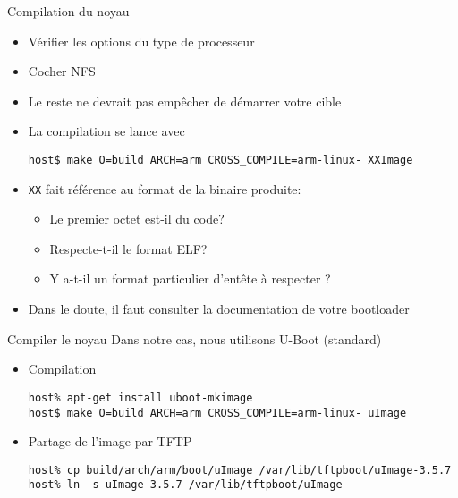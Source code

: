 \begin{frame}[fragile=singleslide]{Compilation du noyau}
  \begin{itemize}
  \item Vérifier les options du type de processeur
  \item Cocher NFS
  \item Le reste ne devrait pas empêcher de démarrer votre cible
  \item La compilation se lance avec
    \begin{lstlisting}
host$ make O=build ARCH=arm CROSS_COMPILE=arm-linux- XXImage
    \end{lstlisting}
  \item \verb+XX+ fait référence au format de la binaire produite:
    \begin{itemize}
    \item Le premier octet est-il du code?
    \item Respecte-t-il le format ELF?
    \item Y a-t-il un format particulier d'entête à respecter ?
    \end{itemize}
  \item Dans  le doute,  il faut consulter  la documentation  de votre
    bootloader
  \end{itemize}
\end{frame}  

\begin{frame}[fragile=singleslide]{Compiler le noyau}
  Dans notre cas, nous utilisons U-Boot (standard)
  \begin{itemize}
  \item Compilation
    \begin{lstlisting}
host% apt-get install uboot-mkimage
host$ make O=build ARCH=arm CROSS_COMPILE=arm-linux- uImage
    \end{lstlisting}
  \item Partage de l'image par TFTP
    \begin{lstlisting}
host% cp build/arch/arm/boot/uImage /var/lib/tftpboot/uImage-3.5.7
host% ln -s uImage-3.5.7 /var/lib/tftpboot/uImage
    \end{lstlisting} %
  \end{itemize}
\end{frame}

